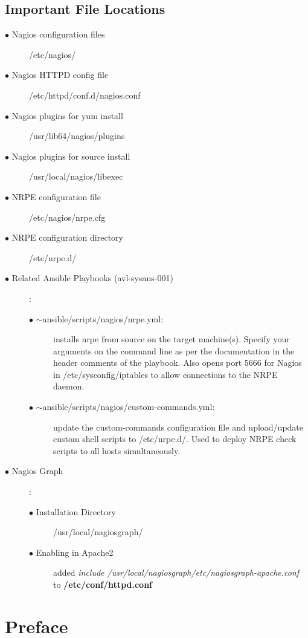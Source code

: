 \documentclass[a4paper]{article}
\begin{document}
\subsection{Important File Locations}
\begin{description}
  \item[$\bullet$ Nagios configuration files] /etc/nagios/
    \item[$\bullet$ Nagios HTTPD config file] /etc/httpd/conf.d/nagios.conf
  \item[$\bullet$ Nagios plugins for yum install] /usr/lib64/nagios/plugins
  \item[$\bullet$ Nagios plugins for source install] /usr/local/nagios/libexec
  \item[$\bullet$ NRPE configuration file] /etc/nagios/nrpe.cfg
  \item[$\bullet$ NRPE configuration directory] /etc/nrpe.d/
  \item[$\bullet$ Related Ansible Playbooks (avl-sysans-001)]:
  \begin{description}
    \item[$\bullet$ $\mathtt{\sim}$ansible/scripts/nagios/nrpe.yml:] installs nrpe from source on the target machine(s). Specify your arguments on the command line as per the documentation in the header comments of the playbook. Also opens port 5666 for Nagios in /etc/sysconfig/iptables to allow connections to the NRPE daemon.
    \item[$\bullet$ $\mathtt{\sim}$ansible/scripts/nagios/custom-commands.yml:] update the custom-commands configuration file and upload/update custom shell scripts to /etc/nrpe.d/. Used to deploy NRPE check scripts to all hosts simultaneously.
  \end{description}
  \item[$\bullet$ Nagios Graph]:
  \begin{description}
    \item[$\bullet$ Installation Directory] /usr/local/nagiosgraph/
    \item[$\bullet$ Enabling in Apache2] added \textit{include /usr/local/nagiosgraph/etc/nagiosgraph-apache.conf} to \textbf{/etc/conf/httpd.conf}
  \end{description}
\end{description}

\section{Preface}
\end{document}
